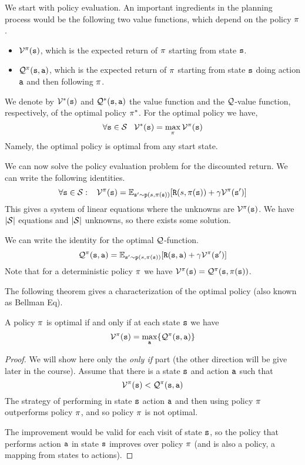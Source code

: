 We start with policy evaluation. An important ingredients in the
planning process would be the following two value functions, which
depend on the policy $\pi$.
\begin{itemize}
\item
$\mathcal{V}^\pi({\tt s})$, which is the expected return of $\pi$
starting from state ${\tt s}$.
\item
$\mathcal{Q}^\pi({\tt s},{\tt a})$, which is the expected return of
$\pi$ starting from state ${\tt s}$ doing action ${\tt a}$ and
then following $\pi$.
\end{itemize}

We denote by $\mathcal{V}^*({\tt s})$ and $\mathcal{Q}^*({\tt s},{\tt a})$ the
value function and the $\mathcal{Q}$-value function, respectively, of
the optimal policy $\pi^*$. For the optimal policy we have,
\[
\forall {\tt s}\in \mathcal{S} \;\;\; \mathcal{V}^*({\tt s})=\max_\pi
\mathcal{V}^\pi({\tt s})
\]
Namely, the optimal policy is optimal from any start state.

\medskip
{}
%
We can now solve the policy evaluation problem for the discounted
return. We can write the following identities.
\[
\forall {\tt s}\in \mathcal{S}:\;\;\; \mathcal{V}^\pi({\tt s})=
\mathbb{E}_{{\tt s}'\sim
{\tt p}(s,\pi({\tt s}))}[{\tt R}(s,\pi({\tt s}))+\gamma
\mathcal{V}^\pi({\tt s}')]
\]
This gives a system of linear equations where the unknowns are
$\mathcal{V}^\pi({\tt s})$. We have $|\mathcal{S}|$ equations and
$|\mathcal{S}|$ unknowns, so there exists some solution.

\medskip
{} We can write the identity for the
optimal $\mathcal{Q}$-function.
\[
\mathcal{Q}^\pi({\tt s},{\tt a})=\mathbb{E}_{{\tt s}'\sim
{\tt p}(s,\pi({\tt s}))}[{\tt R}({\tt s},{\tt a})+\gamma
\mathcal{V}^\pi({\tt s}')]
\]
Note that for a deterministic policy $\pi$ we have
$\mathcal{V}^\pi({\tt s})=\mathcal{Q}^\pi({\tt s},\pi({\tt s}))$.

The following theorem gives a characterization of the optimal policy
(also known as Bellman Eq).
\begin{theorem}
A policy $\pi$ is optimal if and only if at each state ${\tt s}$
we have
\[
\mathcal{V}^\pi({\tt s})=\max_{\tt a}
\{\mathcal{Q}^\pi({\tt s},{\tt a})\}
\]
\end{theorem}

\begin{proof} We will show here only the {\em only if} part (the other direction will be give later in the course).
Assume that there is a state ${\tt s}$ and action ${\tt a}$ such that
\[
\mathcal{V}^\pi({\tt s}) < \mathcal{Q}^\pi({\tt s},{\tt a})
\]
The strategy of performing in state ${\tt s}$ action ${\tt a}$ and
then using policy $\pi$ outperforms policy $\pi$, and so
policy $\pi$ is not optimal.

The improvement would be valid for each visit of state ${\tt s}$, so
the policy that performs action ${\tt a}$ in state ${\tt s}$ improves
over policy $\pi$ (and is also a policy, a mapping from states
to actions).
\end{proof}

